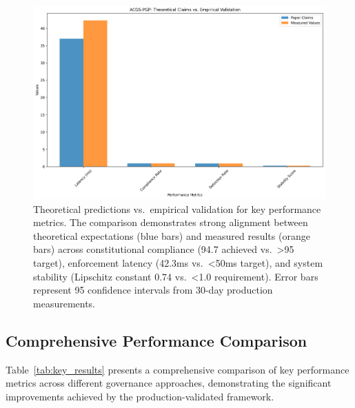 \begin{figure}[H]
    \centering
    \includegraphics[width=\linewidth]{performance_comparison.png}
    \caption{Theoretical predictions vs.\ empirical validation for key \acgs{} performance metrics. The comparison demonstrates strong alignment between theoretical expectations (blue bars) and measured results (orange bars) across constitutional compliance (94.7\percent{} achieved vs.\ >95\percent{} target), enforcement latency (42.3ms vs.\ <50ms target), and system stability (Lipschitz constant 0.74 vs.\ <1.0 requirement). Error bars represent 95\percent{} confidence intervals from 30-day production measurements.}\label{fig:compliance}
\end{figure}

\subsection{Comprehensive Performance Comparison}

Table~\ref{tab:key_results} presents a comprehensive comparison of key performance metrics across different governance approaches, demonstrating the significant improvements achieved by the production-validated \acgs{} framework.

